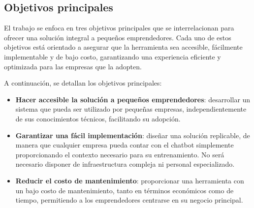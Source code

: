 

\newpage %
\subsection{Objetivos principales}

El trabajo se enfoca en tres objetivos principales que se interrelacionan para ofrecer una solución integral a pequeños emprendedores. Cada uno de estos objetivos está orientado a asegurar que la herramienta sea accesible, fácilmente implementable y de bajo costo, garantizando una experiencia eficiente y optimizada para las empresas que la adopten. 
 
A continuación, se detallan los objetivos principales:


\begin{itemize}
    \item \textbf{Hacer accesible la solución a pequeños emprendedores}: desarrollar un sistema que pueda ser utilizado por pequeñas empresas, independientemente de sus conocimientos técnicos, facilitando su adopción.
    
    \item \textbf{Garantizar una fácil implementación}: diseñar una solución replicable, de manera que cualquier empresa pueda contar con el chatbot simplemente proporcionando el contexto necesario para su entrenamiento. No será necesario disponer de infraestructura compleja ni personal especializado.
    
    \item \textbf{Reducir el costo de mantenimiento}: proporcionar una herramienta con un bajo costo de mantenimiento, tanto en términos económicos como de tiempo, permitiendo a los emprendedores centrarse en su negocio principal.
\end{itemize}



